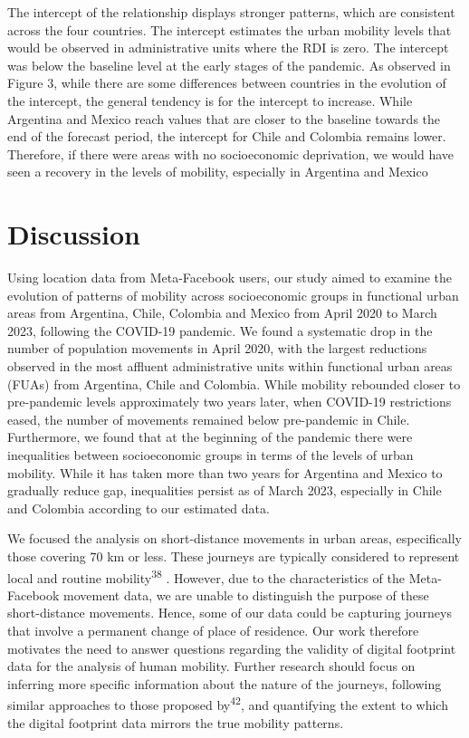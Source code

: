 \documentclass[
  11pt,
]{article}
\begin{document}
The intercept of the relationship displays stronger patterns, which are
consistent across the four countries. The intercept estimates the urban
mobility levels that would be observed in administrative units where the
RDI is zero. The intercept was below the baseline level at the early
stages of the pandemic. As observed in Figure 3, while there are some
differences between countries in the evolution of the intercept, the
general tendency is for the intercept to increase. While Argentina and
Mexico reach values that are closer to the baseline towards the end of
the forecast period, the intercept for Chile and Colombia remains lower.
Therefore, if there were areas with no socioeconomic deprivation, we
would have seen a recovery in the levels of mobility, especially in
Argentina and Mexico

\section{Discussion}\label{sec-discussion}

Using location data from Meta-Facebook users, our study aimed to examine
the evolution of patterns of mobility across socioeconomic groups in
functional urban areas from Argentina, Chile, Colombia and Mexico from
April 2020 to March 2023, following the COVID-19 pandemic. We found a
systematic drop in the number of population movements in April 2020,
with the largest reductions observed in the most affluent administrative
units within functional urban areas (FUAs) from Argentina, Chile and
Colombia. While mobility rebounded closer to pre-pandemic levels
approximately two years later, when COVID-19 restrictions eased, the
number of movements remained below pre-pandemic in Chile. Furthermore,
we found that at the beginning of the pandemic there were inequalities
between socioeconomic groups in terms of the levels of urban mobility.
While it has taken more than two years for Argentina and Mexico to
gradually reduce gap, inequalities persist as of March 2023, especially
in Chile and Colombia according to our estimated data.

We focused the analysis on short-distance movements in urban areas,
especifically those covering 70 km or less. These journeys are typically
considered to represent local and routine mobility\textsuperscript{38} .
However, due to the characteristics of the Meta-Facebook movement data,
we are unable to distinguish the purpose of these short-distance
movements. Hence, some of our data could be capturing journeys that
involve a permanent change of place of residence. Our work therefore
motivates the need to answer questions regarding the validity of digital
footprint data for the analysis of human mobility. Further research
should focus on inferring more specific information about the nature of
the journeys, following similar approaches to those proposed
by\textsuperscript{42}, and quantifying the extent to which the digital
footprint data mirrors the true mobility patterns.
\end{document}
